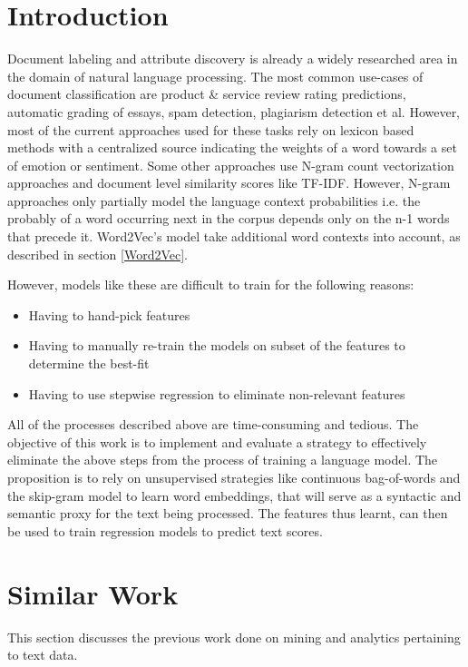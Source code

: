 \documentclass[conference]{IEEEtran}
\begin{document}
\section{Introduction}
Document labeling and attribute discovery is already a widely researched area in the domain of natural language processing. The most common use-cases of document classification are product \& service review rating predictions, automatic grading of essays, spam detection, plagiarism detection et al. However, most of the current approaches used for these tasks rely on lexicon based methods with a centralized source indicating the weights of a word towards a set of emotion or sentiment. Some other approaches use N-gram count vectorization approaches and document level similarity scores like TF-IDF. However, N-gram approaches only partially model the language context probabilities i.e. the probably of a word occurring next in the corpus depends only on the n-1 words that precede it. Word2Vec's model take additional word contexts into account, as described in section \ref{Word2Vec}.

However, models like these are difficult to train for the following reasons:
\begin{itemize}
  \item Having to hand-pick features
  \item Having to manually re-train the models on subset of the features to determine the best-fit
  \item Having to use stepwise regression to eliminate non-relevant features
\end{itemize}

All of the processes described above are time-consuming and tedious. The objective of this work is to implement and evaluate a strategy to effectively eliminate the above steps from the process of training a language model. The proposition is to rely on unsupervised strategies like continuous bag-of-words and the skip-gram model to learn word embeddings, that will serve as a syntactic and semantic proxy for the text being processed. The features thus learnt, can then be used to train regression models to predict text scores.




\section{Similar Work}
This section discusses the previous work done on mining and analytics pertaining to text data.
\end{document}
